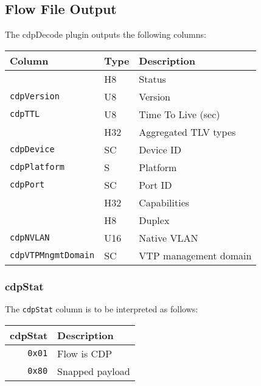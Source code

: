 \documentclass[documentation]{subfiles}
\begin{document}
\subsection{Flow File Output}
The cdpDecode plugin outputs the following columns:
\begin{longtable}{lll}
    \toprule
    {\bf Column} & {\bf Type} & {\bf Description}\\
    \midrule\endhead%
    {\tt \nameref{cdpStat}} & H8 & Status \\
    {\tt cdpVersion} & U8 & Version\\
    {\tt cdpTTL} & U8 & Time To Live (sec)\\
    {\tt \nameref{cdpTLVTypes}} & H32 & Aggregated TLV types\\
    {\tt cdpDevice} & SC & Device ID\\
    {\tt cdpPlatform} & S & Platform\\
    {\tt cdpPort} & SC & Port ID\\
    {\tt \nameref{cdpCaps}} & H32 & Capabilities \\
    {\tt \nameref{cdpDuplex}} & H8 & Duplex\\
    {\tt cdpNVLAN} & U16 & Native VLAN\\
    {\tt cdpVTPMngmtDomain} & SC & VTP management domain\\
    \bottomrule
\end{longtable}

\subsubsection{cdpStat}\label{cdpStat}
The {\tt cdpStat} column is to be interpreted as follows:
\begin{longtable}{rl}
    \toprule
    {\bf cdpStat} & {\bf Description}\\
    \midrule\endhead%
    {\tt 0x01} & Flow is CDP\\
    {\tt 0x80} & Snapped payload\\
    \bottomrule
\end{longtable}
\end{document}
